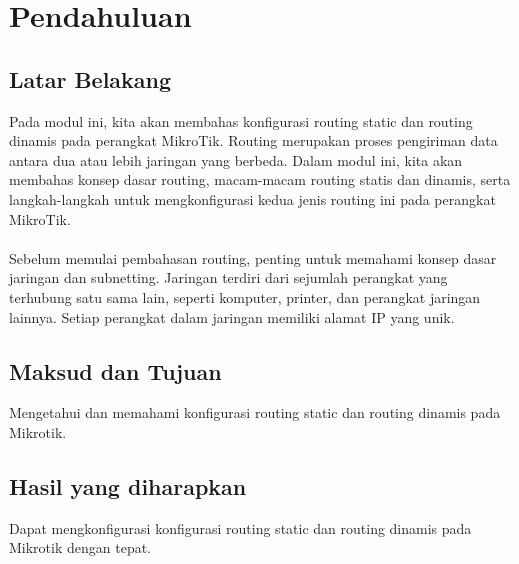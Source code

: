 \section{Pendahuluan}
\subsection{Latar Belakang}
Pada modul ini, kita akan membahas konfigurasi routing static dan routing dinamis pada perangkat
MikroTik. Routing merupakan proses pengiriman data antara dua atau lebih jaringan yang berbeda.
Dalam modul ini, kita akan membahas konsep dasar routing, macam-macam routing statis dan
dinamis, serta langkah-langkah untuk mengkonfigurasi kedua jenis routing ini pada perangkat
MikroTik.\\\\
Sebelum memulai pembahasan routing, penting untuk memahami konsep dasar jaringan dan
subnetting. Jaringan terdiri dari sejumlah perangkat yang terhubung satu sama lain, seperti komputer,
printer, dan perangkat jaringan lainnya. Setiap perangkat dalam jaringan memiliki alamat IP yang
unik.

\subsection{Maksud dan Tujuan}
Mengetahui dan memahami konfigurasi routing static dan routing dinamis pada Mikrotik.

\subsection{Hasil yang diharapkan}
Dapat mengkonfigurasi konfigurasi routing static dan routing dinamis pada Mikrotik dengan
tepat.

